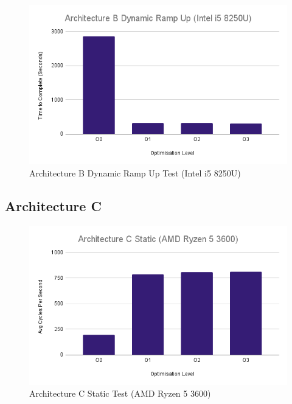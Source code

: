 \documentclass{article}
\begin{document}
\begin{figure}[!h]
\centering
\includegraphics[scale=0.5]{Architecture B Dynamic Ramp Up (Intel i5 8250U).png}
\caption{Architecture B Dynamic Ramp Up Test (Intel i5 8250U)}
\label{arch_b_dynamic_ramp_up_laptop}
\end{figure}

\clearpage

\subsection{Architecture C}
\begin{figure}[!h]
\centering
\includegraphics[scale=0.5]{Architecture C Static (AMD Ryzen 5 3600).png}
\caption{Architecture C Static Test (AMD Ryzen 5 3600)}
\label{arch_c_static_pc}
\end{figure}
\end{document}
